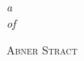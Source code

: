 \documentclass[9pt]{memoir}
\begin{document}
\frontmatter
\thispagestyle{empty}

\mbox{}\vspace{2in}
\noindent
\begin{flushright}
{\LARGE\itshape{}a}\\[2\baselineskip]
{\LARGE\itshape{}of}
\end{flushright}

\vspace{6\baselineskip}
\hfill{\Large\scshape{}Abner Stract}

\cleartorecto\tableofcontents*

\mainmatter
\end{document}
